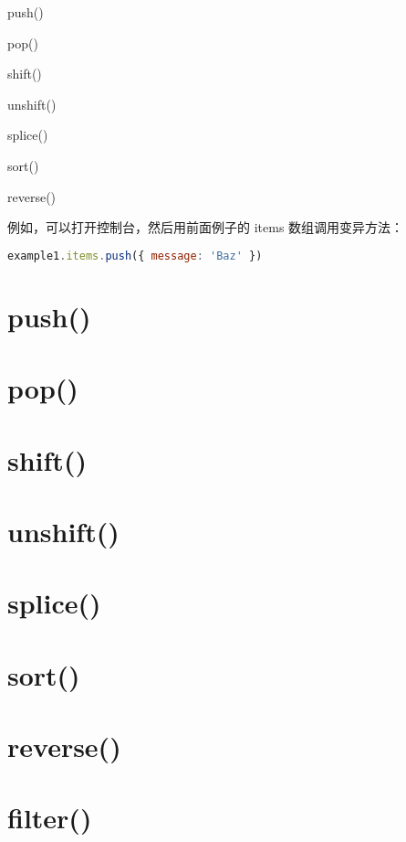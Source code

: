 \begin{compactitem}
\item push()
\item pop()
\item shift()
\item unshift()
\item splice()
\item sort()
\item reverse()
\end{compactitem}

例如，可以打开控制台，然后用前面例子的 items 数组调用变异方法：


\begin{lstlisting}[language=JavaScript]
example1.items.push({ message: 'Baz' })
\end{lstlisting}


\section{push()}


\section{pop()}

\section{shift()}


\section{unshift()}

\section{splice()}

\section{sort()}

\section{reverse()}

\section{filter()}

